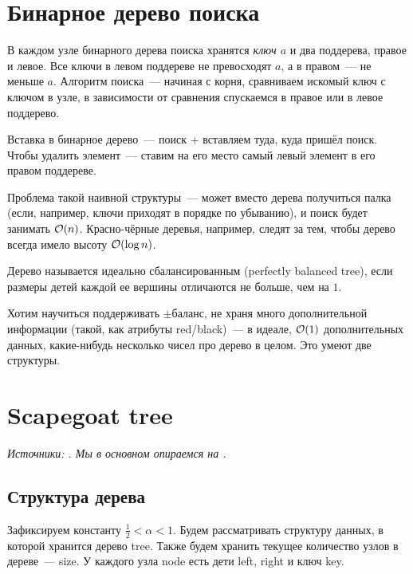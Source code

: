 \section{Бинарное дерево поиска} 

В каждом узле бинарного дерева поиска хранятся {\it ключ $a$} и два поддерева, правое и левое. Все ключи в левом поддереве не превосходят $a$, а в правом~--- не меньше $a$. Алгоритм поиска~--- начиная с корня, сравниваем искомый ключ с ключом в узле, в зависимости от сравнения спускаемся в правое или в левое поддерево.

Вставка в бинарное дерево~--- поиск $+$ вставляем туда, куда пришёл поиск. Чтобы удалить элемент~--- ставим на его место самый левый элемент в его правом поддереве.

Проблема такой наивной структуры~--- может вместо дерева получиться палка (если, например, ключи приходят в порядке по убыванию), и поиск будет занимать $\mathcal{O}(n)$. Красно-чёрные деревья, например, следят за тем, чтобы дерево всегда имело высоту $\mathcal{O}(\log n)$.

\begin{definition}
	Дерево называется идеально сбалансированным (perfectly balanced tree), если размеры детей каждой ее вершины отличаются не больше, чем на $1$.
\end{definition}

Хотим научиться поддерживать $\pm$баланс, не храня много дополнительной информации (такой, как атрибуты red/black)~--- в идеале, $\mathcal{O}(1)$ дополнительных данных, какие-нибудь несколько чисел про дерево в целом. Это умеют две структуры.

\section{Scapegoat tree} \label{sec:scapegoat} 

 {\it Источники: \cite{galperin1993scapegoat,andersson1989improving}. Мы в основном опираемся на \cite{galperin1993scapegoat}.}

 \subsection{Структура дерева}

Зафиксируем константу $\frac{1}{2} < \alpha < 1$. Будем рассматривать структуру данных, в которой хранится дерево tree. Также будем хранить текущее количество узлов в дереве~--- size. У каждого узла node есть дети left, right и ключ key.

